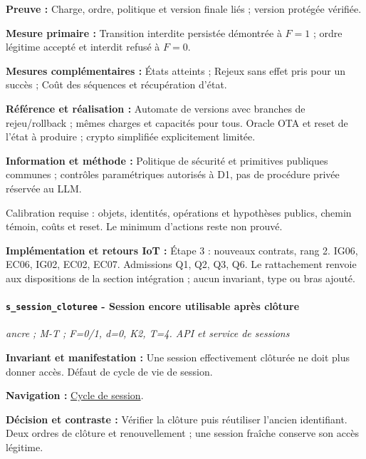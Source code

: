 \documentclass[11pt,a4paper]{article}
\newcommand{\comparisonlink}[2]{\hyperlink{comparison:#1}{#2}}
\begin{document}
\textbf{Preuve :} Charge, ordre, politique et version finale liés ; version protégée vérifiée.

\textbf{Mesure primaire :} Transition interdite persistée démontrée à $F=1$ ; ordre légitime accepté et interdit refusé à $F=0$.

\textbf{Mesures complémentaires :} États atteints ; Rejeux sans effet pris pour un succès ; Coût des séquences et récupération d’état.

\textbf{Référence et réalisation :} Automate de versions avec branches de rejeu/rollback ; mêmes charges et capacités pour tous. Oracle OTA et reset de l’état à produire ; crypto simplifiée explicitement limitée.

\textbf{Information et méthode :} Politique de sécurité et primitives publiques communes ; contrôles paramétriques autorisés à D1, pas de procédure privée réservée au LLM.

Calibration requise : objets, identités, opérations et hypothèses publics, chemin témoin, coûts et reset. Le minimum d’actions reste non prouvé.

\textbf{Implémentation et retours IoT :} Étape 3 : nouveaux contrats, rang 2. IG06, EC06, IG02, EC02, EC07. Admissions Q1, Q2, Q3, Q6. Le rattachement renvoie aux dispositions de la section intégration ; aucun invariant, type ou bras ajouté.

\par\noindent\begin{minipage}{\linewidth}\setlength{\parskip}{5pt}\paragraph{\texttt{s\_session\_cloturee} - Session encore utilisable après clôture}\label{scenario:s_session_cloturee}
\textit{ancre ; M-T ; F=0/1, d=0, K2, T=4. API et service de sessions}

\textbf{Invariant et manifestation :} Une session effectivement clôturée ne doit plus donner accès. Défaut de cycle de vie de session.\par\end{minipage}\par


\textbf{Navigation :} \comparisonlink{E17}{Cycle de session}.

\textbf{Décision et contraste :} Vérifier la clôture puis réutiliser l’ancien identifiant. Deux ordres de clôture et renouvellement ; une session fraîche conserve son accès légitime.
\end{document}
